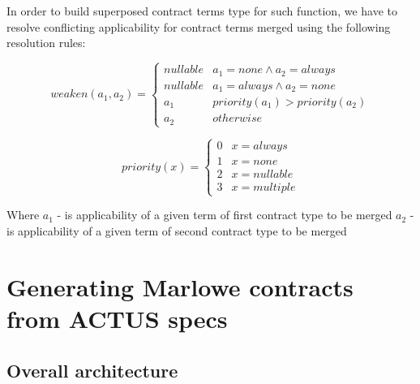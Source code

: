 \documentclass[runningheads]{llncs}
\begin{document}
In order to build superposed contract terms type for such function,
we have to resolve conflicting applicability for contract terms merged
using the following resolution rules:

\noindent 
\begin{equation}
weaken(a_{1},a_{2})=\begin{cases}
nullable & a_{1}=none\wedge a_{2}=always\\
nullable & a_{1}=always\wedge a_{2}=none\\
a_{1} & priority(a_{1})>priority(a_{2})\\
a_{2} & otherwise
\end{cases}
\end{equation}

\noindent 
\begin{equation}
priority(x)=\begin{cases}
0 & x=always\\
1 & x=none\\
2 & x=nullable\\
3 & x=multiple
\end{cases}
\end{equation}

Where $a_{1}$ - is applicability of a given term of first contract
type to be merged $a_{2}$ - is applicability of a given term of second
contract type to be merged

\section{Generating Marlowe contracts from ACTUS specs}%
\label{generation}

\subsection{Overall architecture }
\end{document}
